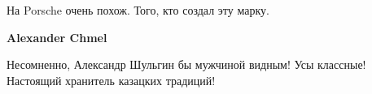  
 
 
 
 

На Porsche очень похож. Того, кто создал эту марку.

\textbf{Alexander Chmel} 

Несомненно, Александр Шульгин бы мужчиной видным! Усы классные! Настоящий
хранитель казацких традиций!
